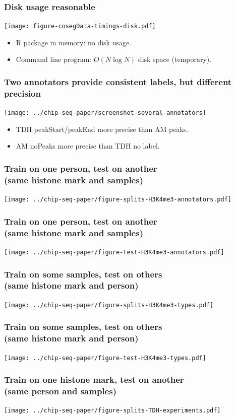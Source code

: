 \documentclass{beamer}
\begin{document}
\begin{frame}
  \frametitle{Disk usage reasonable}
  \texttt{[image: figure-cosegData-timings-disk.pdf]}
  \begin{itemize}
  \item R package in memory: no disk usage.
  \item Command line program: $O(N \log N)$ disk space (temporary).
  \end{itemize}
\end{frame}

\begin{frame}
  \frametitle{Two annotators provide consistent labels, but different
    precision}
  \texttt{[image: ../chip-seq-paper/screenshot-several-annotators]}

  \begin{itemize}
  \item TDH peakStart/peakEnd more precise than AM peaks.
  \item AM noPeaks more precise than TDH no label.
  \end{itemize}
\end{frame}

\begin{frame}
  \frametitle{Train on one person, test on another\\
(same histone mark and samples)}
  \texttt{[image: ../chip-seq-paper/figure-splits-H3K4me3-annotators.pdf]}
\end{frame}

\begin{frame}
  \frametitle{Train on one person, test on another\\
(same histone mark and samples)}
  \texttt{[image: ../chip-seq-paper/figure-test-H3K4me3-annotators.pdf]}
\end{frame}

\begin{frame}
  \frametitle{Train on some samples, test on others\\
(same histone mark and person)}
  \texttt{[image: ../chip-seq-paper/figure-splits-H3K4me3-types.pdf]}
\end{frame}

\begin{frame}
  \frametitle{Train on some samples, test on others\\
(same histone mark and person)}
  \texttt{[image: ../chip-seq-paper/figure-test-H3K4me3-types.pdf]}
\end{frame}

\begin{frame}
  \frametitle{Train on one histone mark, test on another\\
(same person and samples)}
  \texttt{[image: ../chip-seq-paper/figure-splits-TDH-experiments.pdf]}
\end{frame}
\end{document}
